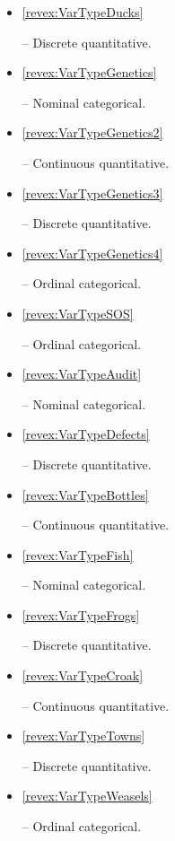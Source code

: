 \documentclass[10pt,openany]{book}\usepackage[]{graphicx}\usepackage[]{color}
\begin{document}
\begin{itemize}
  \item \hypertarget{ans:VarTypeDucks}{\ref{revex:VarTypeDucks}} -- Discrete quantitative.

  \item \hypertarget{ans:VarTypeGenetics}{\ref{revex:VarTypeGenetics}} -- Nominal categorical.

  \item \hypertarget{ans:VarTypeGenetics2}{\ref{revex:VarTypeGenetics2}} -- Continuous quantitative.

  \item \hypertarget{ans:VarTypeGenetics3}{\ref{revex:VarTypeGenetics3}} -- Discrete quantitative.

  \item \hypertarget{ans:VarTypeGenetics4}{\ref{revex:VarTypeGenetics4}} -- Ordinal categorical.

  \item \hypertarget{ans:VarTypeSOS}{\ref{revex:VarTypeSOS}} -- Ordinal categorical.

  \item \hypertarget{ans:VarTypeAudit}{\ref{revex:VarTypeAudit}} -- Nominal categorical.

  \item \hypertarget{ans:VarTypeDefects}{\ref{revex:VarTypeDefects}} -- Discrete quantitative.

  \item \hypertarget{ans:VarTypeBottles}{\ref{revex:VarTypeBottles}} -- Continuous quantitative.

  \item \hypertarget{ans:VarTypeFish}{\ref{revex:VarTypeFish}} -- Nominal categorical.

  \item \hypertarget{ans:VarTypeFrogs}{\ref{revex:VarTypeFrogs}} -- Discrete quantitative.

  \item \hypertarget{ans:VarTypeCroak}{\ref{revex:VarTypeCroak}} -- Continuous quantitative.

  \item \hypertarget{ans:VarTypeTowns}{\ref{revex:VarTypeTowns}} -- Discrete quantitative.

  \item \hypertarget{ans:VarTypeWeasels}{\ref{revex:VarTypeWeasels}} -- Ordinal categorical.
\end{itemize}



\end{document}
